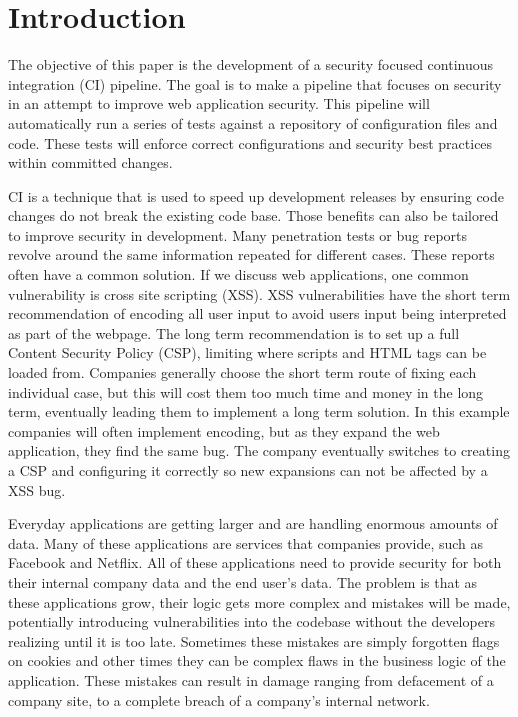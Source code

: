 \section{Introduction}
    The objective of this paper is the development of a security focused continuous integration (CI) pipeline. The goal is to make a pipeline that focuses on security in an attempt to improve web
    application security. This pipeline will automatically run a series of tests against a repository of configuration files and code. These tests will enforce correct configurations and security
    best practices within committed changes.

    CI is a technique that is used to speed up development releases by ensuring code changes do not break the existing code base. Those benefits can also be tailored to improve security in 
    development. Many penetration tests or bug reports revolve around the same information repeated for different cases. These reports often have a common solution. If we discuss web applications, one 
    common vulnerability is cross site scripting (XSS). XSS vulnerabilities have the short term recommendation of encoding all user input to avoid users input being interpreted as part of the webpage. 
    The long term recommendation is to set up a full Content Security Policy (CSP), limiting where scripts and HTML tags can be loaded from. Companies generally choose the short term route of fixing 
    each individual case, but this will cost them too much time and money in the long term, eventually leading them to implement a long term solution. In this example companies will often implement encoding, 
    but as they expand the web application, they find the same bug. The company eventually switches to creating a CSP and configuring it correctly so new expansions can not be affected by a XSS bug.
    
    Everyday applications are getting larger and are handling enormous amounts of data. Many of these applications are services that companies provide, such as Facebook and Netflix. All of these 
    applications need to provide security for both their internal company data and the end user's data. The problem is that as these applications grow, their logic gets more complex and mistakes will 
    be made, potentially introducing vulnerabilities into the codebase without the developers realizing until it is too late. Sometimes these mistakes are simply forgotten flags on cookies and other
    times they can be complex flaws in the business logic of the application. These mistakes can result in damage ranging from defacement of a company site, to a complete breach of a company's 
    internal network.

